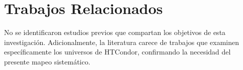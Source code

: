 \section{Trabajos Relacionados}\label{sec:trabajos-relacionados}

No se identificaron estudios previos que compartan los objetivos de
esta investigación. Adicionalmente, la literatura carece de trabajos
que examinen específicamente los universos de HTCondor, confirmando
la necesidad del presente mapeo sistemático.